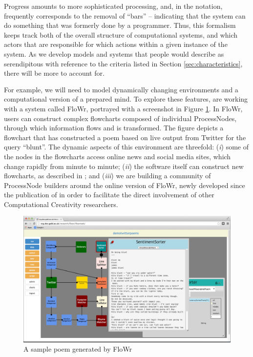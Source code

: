 \documentclass{llncs}
\begin{document}
Progress amounts to more sophisticated processing, and, in the
notation, frequently corresponds to the removal of ``bars'' --
indicating that the system can do something that was formerly done by
a programmer.
%
Thus, this formalism keeps track both of the overall structure of
computational systems, and which actors that are responsible for which
actions within a given instance of the system.
%
As we develop models and systems that people would describe as
serendipitous with reference to the criteria listed in Section
\ref{sec:characteristics}, there will be more to account for.  

\smallskip

For example, we will need to model dynamically changing environments
and a computational version of a prepared mind.
%
To explore these features, are working with a system called {\sf
  FloWr}, portrayed with a screenshot in Figure \ref{fig:being-blunt}.
In {\sf FloWr}, users can construct complex flowcharts composed of
individual ProcessNodes, through which information flows and is
transformed.  The figure depicts a flowchart that has constructed a
poem based on live output from Twitter for the query ``blunt''.  The
dynamic aspects of this environment are threefold: (\emph{i}) some of
the nodes in the flowcharts access online news and social media sites,
which change rapidly from minute to minute; (\emph{ii}) the software
itself can construct new flowcharts, as described in
\cite{charnley2014flowr}; and (\emph{iii}) we are building a community
of ProcessNode builders around the online version of {\sf FloWr},
newly developed since the publication of \cite{charnley2014flowr} in
order to facilitate the direct involvement of other Computational
Creativity researchers.

\begin{figure}
\centering
\includegraphics[width=.95\textwidth]{being-blunt}
\caption{A sample poem generated by {\sf FloWr}\label{fig:being-blunt}}
\end{figure}
\end{document}
